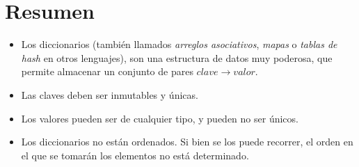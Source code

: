\section{Resumen}

\begin{itemize}
\item Los diccionarios (también llamados \emph{arreglos asociativos},
\emph{mapas} o \emph{tablas de hash} en otros lenguajes), son una estructura de datos
muy poderosa, que permite almacenar un conjunto de pares $clave \rightarrow valor$.
\item Las claves deben ser inmutables y únicas.
\item Los valores pueden ser de cualquier tipo, y pueden no ser únicos.
\item Los diccionarios no están ordenados.  Si bien se los puede recorrer,
el orden en el que se tomarán los elementos no está determinado.
\end{itemize}

